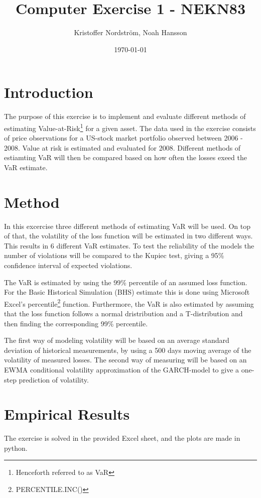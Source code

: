 \documentclass[a4paper]{article}
\title{Computer Exercise 1 - NEKN83}
\author{Kristoffer Nordström, Noah Hansson}
\date{\today}
\begin{document}
\maketitle

\section{Introduction}
The purpose of this exercise is to implement and evaluate different methods of estimating Value-at-Risk\footnote{Henceforth referred to as VaR} for a given asset. The data used in the exercise consists of price observations for a US-stock market portfolio observed between 2006 - 2008. Value at risk is estimated and evaluated for 2008. Different methods of estiamting VaR will then be compared based on how often the losses exeed the VaR estimate.

\section{Method}
In this excercise three different methods of estimating VaR will be used. On top of that, the volatility of the loss function will be estimated in two different ways. This results in 6 different VaR estimates. To test the reliability of the models the number of violations will be compared to the Kupiec test, giving a 95\% confidence interval of expected violations.

The VaR is estimated by using the 99\% percentile of an assumed loss function. For the Basic Historical Simulation (BHS) estimate this is done using Microsoft Excel's percentile\footnote{PERCENTILE.INC()} function. Furthermore, the VaR is also estimated by assuming that the loss function follows a normal dristribution and a T-distribution and then finding the corresponding 99\% percentile.

The first way of modeling volatility will be based on an average standard deviation of historical measurements, by using a 500 days moving average of the volatility of measured losses. The second way of measuring will be based on an EWMA conditional volatility approximation of the GARCH-model to give a one-step prediction of volatility.



\section{Empirical Results}
The exercise is solved in the provided Excel sheet, and the plots are made in python. 
\end{document}
